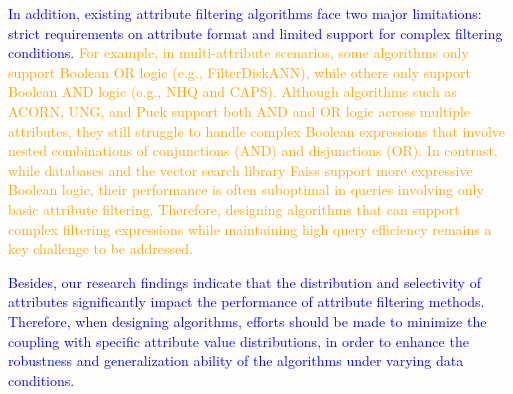 \documentclass[sigconf, nonacm]{acmart}
\begin{document}
{	\textcolor{blue}{In addition, existing attribute filtering algorithms face two major limitations: strict requirements on attribute format and limited support for complex filtering conditions. }
		\textcolor{orange}{
For example, in multi-attribute scenarios, some algorithms only support Boolean OR logic (e.g., FilterDiskANN), while others only support Boolean AND logic (e.g., NHQ and CAPS). Although algorithms such as ACORN, UNG, and Puck support both AND and OR logic across multiple attributes, they still struggle to handle complex Boolean expressions that involve nested combinations of conjunctions (AND) and disjunctions (OR). In contrast, while databases and the vector search library Faiss support more expressive Boolean logic, their performance is often suboptimal in queries involving only basic attribute filtering.
Therefore, designing algorithms that can support complex filtering expressions while maintaining high query efficiency remains a key challenge to be addressed.
		}
		
	\textcolor{blue}{
	Besides, our research findings indicate that the distribution and selectivity of attributes significantly impact the performance of attribute filtering methods. Therefore, when designing algorithms, efforts should be made to minimize the coupling with specific attribute value distributions, in order to enhance the robustness and generalization ability of the algorithms under varying data conditions.}
	
	
}
\end{document}
